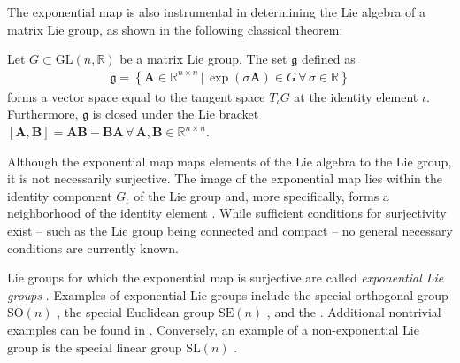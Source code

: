 The exponential map is also instrumental in determining the Lie algebra of a matrix Lie group, as shown in the following classical theorem:
\begin{theorem}
    Let $G\subset\text{GL}(n, \mathbb{R})$ be a matrix Lie group. The set $\mathfrak{g}$ defined as
    \begin{align}
        \mathfrak{g} = \left\{\mathbf{A}\in\mathbb{R}^{n\times n} \,|\, \exp(\sigma\mathbf{A})\in G\,\forall\,\sigma\in\mathbb{R}\right\}
    \end{align}
    forms a vector space equal to the tangent space $T_\iota G$ at the identity element $\iota$. Furthermore, $\mathfrak{g}$ is closed under the Lie bracket $[\mathbf{A}, \mathbf{B}] = \mathbf{A}\mathbf{B} - \mathbf{B}\mathbf{A}\,\forall\,\mathbf{A},\mathbf{B}\in\mathbb{R}^{n\times n}$.\hfill\qedsymbol
\end{theorem}

Although the exponential map maps elements of the Lie algebra to the Lie group, it is not necessarily surjective. The image of the exponential map lies within the identity component $G_\iota$ of the Lie group and, more specifically, forms a neighborhood of the identity element \citep[p. 56]{Hall2015}. While sufficient conditions for surjectivity exist -- such as the Lie group being connected and compact \citep[p. 316]{Hall2015} -- no general necessary conditions are currently known.

Lie groups for which the exponential map is surjective are called \emph{exponential Lie groups} \citep{djokovic1995exponential}. Examples of exponential Lie groups include the special orthogonal group $\text{SO}(n)$ \citep[p. 28]{Gallier2020}, the special Euclidean  group $\text{SE}(n)$ \citep[p. 42]{Gallier2020}, and the . Additional nontrivial examples can be found in \citet{djokovic1995exponential}. Conversely, an example of a non-exponential Lie group is the special linear group $\text{SL}(n)$ \citep[p. 28]{Gallier2020}.

